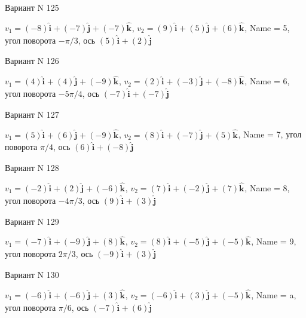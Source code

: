 \documentclass[11pt]{report}
\begin{document}
Вариант N 125

$v_1 = \left(-8\right)\mathbf{\hat{i}_{}} + \left(-7\right)\mathbf{\hat{j}_{}} + \left(-7\right)\mathbf{\hat{k}_{}}$, $v_2 = \left(9\right)\mathbf{\hat{i}_{}} + \left(5\right)\mathbf{\hat{j}_{}} + \left(6\right)\mathbf{\hat{k}_{}}$, Name = 5, угол поворота $- \pi / 3$, ось $\left(5\right)\mathbf{\hat{i}_{}} + \left(2\right)\mathbf{\hat{j}_{}}$

Вариант N 126

$v_1 = \left(4\right)\mathbf{\hat{i}_{}} + \left(4\right)\mathbf{\hat{j}_{}} + \left(-9\right)\mathbf{\hat{k}_{}}$, $v_2 = \left(2\right)\mathbf{\hat{i}_{}} + \left(-3\right)\mathbf{\hat{j}_{}} + \left(-8\right)\mathbf{\hat{k}_{}}$, Name = 6, угол поворота $- 5 \pi / 4$, ось $\left(-7\right)\mathbf{\hat{i}_{}} + \left(-7\right)\mathbf{\hat{j}_{}}$

Вариант N 127

$v_1 = \left(5\right)\mathbf{\hat{i}_{}} + \left(6\right)\mathbf{\hat{j}_{}} + \left(-9\right)\mathbf{\hat{k}_{}}$, $v_2 = \left(8\right)\mathbf{\hat{i}_{}} + \left(-7\right)\mathbf{\hat{j}_{}} + \left(5\right)\mathbf{\hat{k}_{}}$, Name = 7, угол поворота $\pi / 4$, ось $\left(6\right)\mathbf{\hat{i}_{}} + \left(-8\right)\mathbf{\hat{j}_{}}$

Вариант N 128

$v_1 = \left(-2\right)\mathbf{\hat{i}_{}} + \left(2\right)\mathbf{\hat{j}_{}} + \left(-6\right)\mathbf{\hat{k}_{}}$, $v_2 = \left(7\right)\mathbf{\hat{i}_{}} + \left(-2\right)\mathbf{\hat{j}_{}} + \left(7\right)\mathbf{\hat{k}_{}}$, Name = 8, угол поворота $- 4 \pi / 3$, ось $\left(9\right)\mathbf{\hat{i}_{}} + \left(3\right)\mathbf{\hat{j}_{}}$

Вариант N 129

$v_1 = \left(-7\right)\mathbf{\hat{i}_{}} + \left(-9\right)\mathbf{\hat{j}_{}} + \left(8\right)\mathbf{\hat{k}_{}}$, $v_2 = \left(8\right)\mathbf{\hat{i}_{}} + \left(-5\right)\mathbf{\hat{j}_{}} + \left(-5\right)\mathbf{\hat{k}_{}}$, Name = 9, угол поворота $2 \pi / 3$, ось $\left(-9\right)\mathbf{\hat{i}_{}} + \left(3\right)\mathbf{\hat{j}_{}}$

Вариант N 130

$v_1 = \left(-6\right)\mathbf{\hat{i}_{}} + \left(-6\right)\mathbf{\hat{j}_{}} + \left(3\right)\mathbf{\hat{k}_{}}$, $v_2 = \left(-6\right)\mathbf{\hat{i}_{}} + \left(3\right)\mathbf{\hat{j}_{}} + \left(-5\right)\mathbf{\hat{k}_{}}$, Name = a, угол поворота $\pi / 6$, ось $\left(-7\right)\mathbf{\hat{i}_{}} + \left(6\right)\mathbf{\hat{j}_{}}$
\end{document}

